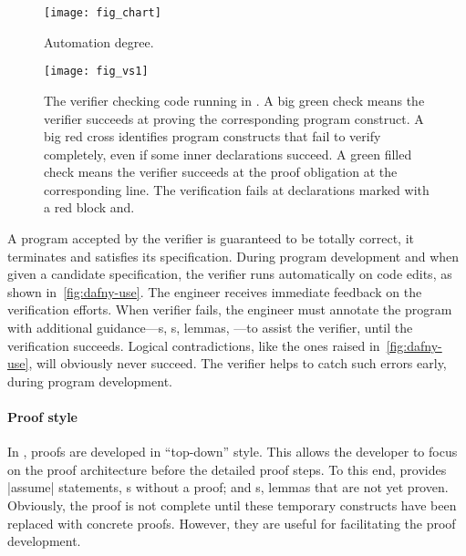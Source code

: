 \begin{figure}[ht]
\centering
\texttt{[image: fig\_chart]}
\caption[Automation degree chart]{Automation degree.}
\label{fig:dafny-auto}
\end{figure}

\begin{figure}[p]
\begin{center}
\texttt{[image: fig\_vs1]}
\end{center}
\caption[Dafny running in Visual Studio Code]{
The  verifier checking  code running in . A big green check{ }{ }\circledb[dafnyok]{\faCheck}{ }means the
verifier succeeds at proving the corresponding program construct. A big red
cross{ }{ }\circledb[dafnyno]{\scalebox{1.25}{\faTimes}}{ }identifies program
constructs that fail to verify completely, even if some inner declarations
succeed. A green filled check {\color{dafnyok}{\scalebox{.8}{\faCheckCircle}}}
means the verifier succeeds at the proof obligation at the corresponding line.
The verification fails at declarations marked with a red block
 and\;.
}\label{fig:dafny-use}
\end{figure}

A program accepted by the  verifier is guaranteed to be totally
correct, \ie it terminates and satisfies its
specification. During program development and when given a
candidate specification, the verifier runs automatically on code edits, as shown
in~\autoref{fig:dafny-use}. The engineer receives immediate feedback on the
verification efforts. When  verifier fails, the engineer must
annotate the program with additional guidance---s, s,
lemmas, \etc---to assist the verifier, until the verification succeeds. Logical
contradictions, like the ones raised in~\autoref{fig:dafny-use}, will obviously
never succeed. The verifier helps to catch such errors early, during program
development.

\paragraph*{Proof style}
In , proofs are developed in \enquote{top-down} style. This allows
the developer to focus on the proof architecture before the detailed proof
steps. To this end,  provides \pr|assume| statements, \ie
{}s without a proof; and s, \ie lemmas that are
not yet proven. Obviously, the proof is not complete until these temporary
constructs have been replaced with concrete proofs. However, they are useful for
facilitating the proof development.

